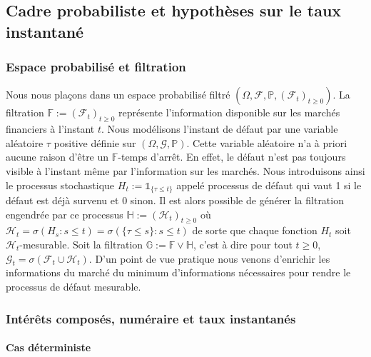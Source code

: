 \subsection{Cadre probabiliste et hypothèses sur le taux instantané}

\subsubsection{Espace probabilisé et filtration}\label{subsubsec:espace_prob_filtre}

Nous nous plaçons dans un espace probabilisé filtré 
$(\Omega, \mathcal{F}, \mathbb{P}, (\mathcal{F}_t)_{t \geq 0})$. La filtration $\mathbb{F}:=(\mathcal{F}_t)_{t \geq 0}$ représente 
l'information disponible sur les marchés financiers à l'instant $t$. Nous modélisons l'instant
de défaut par une variable aléatoire $\tau$ positive définie sur $(\Omega, \mathcal{G}, \mathbb{P})$.
Cette variable aléatoire n'a à priori aucune raison d'être un $\mathbb{F}$-temps d'arrêt.
En effet, le défaut n'est pas toujours visible à l'instant même par l'information sur les marchés.
Nous introduisons ainsi le processus stochastique $H_t := \mathbb{1}_{\{ \tau \le t \}}$ appelé processus
de défaut qui vaut 1 si le défaut est déjà survenu et 0 sinon. Il est alors possible de générer la
filtration engendrée par ce processus $\mathbb{H}:=(\mathcal{H}_t)_{t\ge0}$ où $\mathcal{H}_t = 
\sigma(H_s : s \leq t) = \sigma(\{\tau \leq s\} : s \leq t)$ de sorte que chaque fonction
$H_t$ soit $\mathcal{H}_t$-mesurable. Soit la filtration $\mathbb{G} := \mathbb{F} \vee \mathbb{H} $,
c'est à dire pour tout $t \ge 0$, $\mathcal{G}_t = \sigma(\mathcal{F}_t \cup \mathcal{H}_t) $. D'un point
de vue pratique nous venons d'enrichir les informations du marché du minimum d'informations nécessaires
pour rendre le processus de défaut mesurable.\cite{defaut_intensite}

\subsubsection{Intérêts composés, numéraire et taux instantanés}

\paragraph{Cas déterministe}

